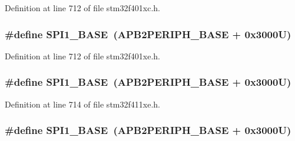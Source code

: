 Definition at line 712 of file stm32f401xc.\+h.

\subsubsection[{\texorpdfstring{S\+P\+I1\+\_\+\+B\+A\+SE}{SPI1_BASE}}]{\setlength{\rightskip}{0pt plus 5cm}\#define S\+P\+I1\+\_\+\+B\+A\+SE~({\bf A\+P\+B2\+P\+E\+R\+I\+P\+H\+\_\+\+B\+A\+SE} + 0x3000\+U)}\hypertarget{group___peripheral__registers__structures_ga50cd8b47929f18b05efbd0f41253bf8d}{}\label{group___peripheral__registers__structures_ga50cd8b47929f18b05efbd0f41253bf8d}


Definition at line 712 of file stm32f401xe.\+h.

\subsubsection[{\texorpdfstring{S\+P\+I1\+\_\+\+B\+A\+SE}{SPI1_BASE}}]{\setlength{\rightskip}{0pt plus 5cm}\#define S\+P\+I1\+\_\+\+B\+A\+SE~({\bf A\+P\+B2\+P\+E\+R\+I\+P\+H\+\_\+\+B\+A\+SE} + 0x3000\+U)}\hypertarget{group___peripheral__registers__structures_ga50cd8b47929f18b05efbd0f41253bf8d}{}\label{group___peripheral__registers__structures_ga50cd8b47929f18b05efbd0f41253bf8d}


Definition at line 714 of file stm32f411xe.\+h.

\subsubsection[{\texorpdfstring{S\+P\+I1\+\_\+\+B\+A\+SE}{SPI1_BASE}}]{\setlength{\rightskip}{0pt plus 5cm}\#define S\+P\+I1\+\_\+\+B\+A\+SE~({\bf A\+P\+B2\+P\+E\+R\+I\+P\+H\+\_\+\+B\+A\+SE} + 0x3000\+U)}\hypertarget{group___peripheral__registers__structures_ga50cd8b47929f18b05efbd0f41253bf8d}{}\label{group___peripheral__registers__structures_ga50cd8b47929f18b05efbd0f41253bf8d}



